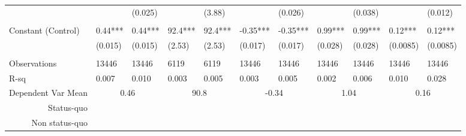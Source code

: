 \begin{tabular}{rrrrrrrrrrr}
      &       & \multicolumn{1}{l}{\cellcolor[rgb]{ .859,  .859,  .859} (0.025)} &       & \multicolumn{1}{l}{\cellcolor[rgb]{ .859,  .859,  .859} (3.88)} &       & \multicolumn{1}{l}{\cellcolor[rgb]{ .859,  .859,  .859} (0.026)} &       & \multicolumn{1}{l}{\cellcolor[rgb]{ .859,  .859,  .859} (0.038)} &       & \multicolumn{1}{l}{\cellcolor[rgb]{ .859,  .859,  .859} (0.012)} \\
      &       &       &       &       &       &       &       &       &       &  \\
\multicolumn{1}{l}{Constant (Control)} & \multicolumn{1}{l}{0.44***} & \multicolumn{1}{l}{0.44***} & \multicolumn{1}{l}{92.4***} & \multicolumn{1}{l}{92.4***} & \multicolumn{1}{l}{-0.35***} & \multicolumn{1}{l}{-0.35***} & \multicolumn{1}{l}{0.99***} & \multicolumn{1}{l}{0.99***} & \multicolumn{1}{l}{0.12***} & \multicolumn{1}{l}{0.12***} \\
\multicolumn{1}{l}{} & \multicolumn{1}{l}{(0.015)} & \multicolumn{1}{l}{(0.015)} & \multicolumn{1}{l}{(2.53)} & \multicolumn{1}{l}{(2.53)} & \multicolumn{1}{l}{(0.017)} & \multicolumn{1}{l}{(0.017)} & \multicolumn{1}{l}{(0.028)} & \multicolumn{1}{l}{(0.028)} & \multicolumn{1}{l}{(0.0085)} & \multicolumn{1}{l}{(0.0085)} \\
      &       &       &       &       &       &       &       &       &       &  \\
\midrule
\multicolumn{1}{l}{Observations} & \multicolumn{1}{l}{13446} & \multicolumn{1}{l}{13446} & \multicolumn{1}{l}{6119} & \multicolumn{1}{l}{6119} & \multicolumn{1}{l}{13446} & \multicolumn{1}{l}{13446} & \multicolumn{1}{l}{13446} & \multicolumn{1}{l}{13446} & \multicolumn{1}{l}{13446} & \multicolumn{1}{l}{13446} \\
\multicolumn{1}{l}{R-sq} & \multicolumn{1}{l}{0.007} & \multicolumn{1}{l}{0.010} & \multicolumn{1}{l}{0.003} & \multicolumn{1}{l}{0.005} & \multicolumn{1}{l}{0.003} & \multicolumn{1}{l}{0.005} & \multicolumn{1}{l}{0.002} & \multicolumn{1}{l}{0.006} & \multicolumn{1}{l}{0.010} & \multicolumn{1}{l}{0.028} \\
\multicolumn{1}{l}{Dependent Var Mean} & \multicolumn{2}{c}{0.46} & \multicolumn{2}{c}{90.8} & \multicolumn{2}{c}{-0.34} & \multicolumn{2}{c}{1.04} & \multicolumn{2}{c}{0.16} \\
\midrule
\midrule
\rowcolor[rgb]{ .929,  .929,  .929} Status-quo & \cellcolor[rgb]{ 1,  1,  1}  & \cellcolor[rgb]{ 1,  1,  1}  & \cellcolor[rgb]{ 1,  1,  1}  & \cellcolor[rgb]{ 1,  1,  1}  & \cellcolor[rgb]{ 1,  1,  1}  & \cellcolor[rgb]{ 1,  1,  1}  & \cellcolor[rgb]{ 1,  1,  1}  & \cellcolor[rgb]{ 1,  1,  1}  & \cellcolor[rgb]{ 1,  1,  1}  & \cellcolor[rgb]{ 1,  1,  1}  \\
\rowcolor[rgb]{ .859,  .859,  .859} Non status-quo & \cellcolor[rgb]{ 1,  1,  1}  & \cellcolor[rgb]{ 1,  1,  1}  & \cellcolor[rgb]{ 1,  1,  1}  & \cellcolor[rgb]{ 1,  1,  1}  & \cellcolor[rgb]{ 1,  1,  1}  & \cellcolor[rgb]{ 1,  1,  1}  & \cellcolor[rgb]{ 1,  1,  1}  & \cellcolor[rgb]{ 1,  1,  1}  & \cellcolor[rgb]{ 1,  1,  1}  & \cellcolor[rgb]{ 1,  1,  1}  \\
\end{tabular}%
